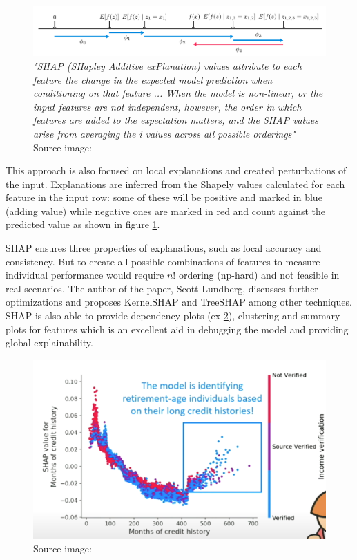 \documentclass[proposal]{softeng}
\begin{document}
\begin{figure}[h!]
\centering

\includegraphics[width=1.0\textwidth]{images/shap_feature_ordering.png}

\caption{\textit{"SHAP (SHapley Additive exPlanation) values attribute to each feature the change in the expected model prediction when conditioning on that feature ... When the model is non-linear, or the input features are not independent, however, the order in which features are added to the expectation matters, and the SHAP values arise from averaging the i values across all possible orderings"} Source image: \cite{LundbergScott2017AUAt}}

\label{fig:shap_feature_ordering}
\end{figure}

This approach is also focused on local explanations and created perturbations of the input. Explanations are inferred from the Shapely values calculated for each feature in the input row: some of these will be positive and marked in blue (adding value) while negative ones are marked in red and count against the predicted value as shown in figure \ref{fig:shap_feature_ordering}.

SHAP ensures three properties of explanations, such as local accuracy and consistency. But to create all possible combinations of features to measure individual performance would require  $ n! $ ordering (np-hard) and not feasible in real scenarios. The author of the paper, Scott Lundberg, discusses further optimizations \cite{Lundberg} and proposes
KernelSHAP and TreeSHAP among other techniques. SHAP is also able to provide dependency plots (ex \ref{fig:shap_dp}), clustering and summary plots for features which is an excellent aid in debugging the model and providing global explainability.

\begin{figure}[h!]
\centering

\includegraphics[width=.6\textwidth]{images/shap_dp.png}

\caption{Source image: \cite{Lundberg}}

\label{fig:shap_dp}
\end{figure}
\end{document}
